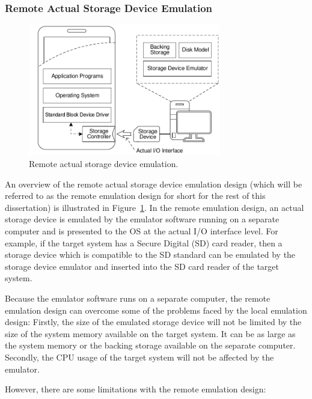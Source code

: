 \subsubsection{Remote Actual Storage Device Emulation}

\begin{figure}[htpb!]
	\centering
	\includegraphics[width=0.75\textwidth]{figures/remote-actual-emulation.pdf}
	\caption{\label{fig:remote-actual-emulation}Remote actual storage device emulation.}
\end{figure}

An overview of the remote actual storage device emulation design (which will be referred to as the remote emulation design for short for the rest of this dissertation) is illustrated in Figure~\ref{fig:remote-actual-emulation}. In the remote emulation design, an actual storage device is emulated by the emulator software running on a separate computer and is presented to the OS at the actual I/O interface level. For example, if the target system has a Secure Digital (SD) card reader, then a storage device which is compatible to the SD standard can be emulated by the storage device emulator and inserted into the SD card reader of the target system.

Because the emulator software runs on a separate computer, the remote emulation design can overcome some of the problems faced by the local emulation design: Firstly, the size of the emulated storage device will not be limited by the size of the system memory available on the target system. It can be as large as the system memory or the backing storage available on the separate computer. Secondly, the CPU usage of the target system will not be affected by the emulator.

However, there are some limitations with the remote emulation design:

